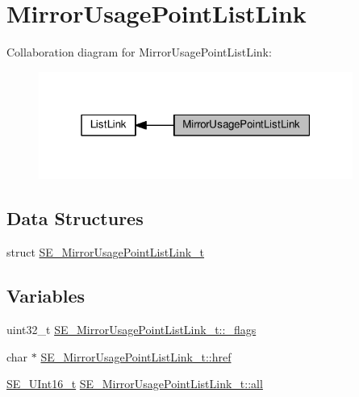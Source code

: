 \hypertarget{group__MirrorUsagePointListLink}{}\section{Mirror\+Usage\+Point\+List\+Link}
\label{group__MirrorUsagePointListLink}
Collaboration diagram for Mirror\+Usage\+Point\+List\+Link\+:\nopagebreak
\begin{figure}[H]
\begin{center}
\leavevmode
\includegraphics[width=292pt]{group__MirrorUsagePointListLink}
\end{center}
\end{figure}
\subsection*{Data Structures}
\begin{DoxyCompactItemize}
\item 
struct \hyperlink{structSE__MirrorUsagePointListLink__t}{S\+E\+\_\+\+Mirror\+Usage\+Point\+List\+Link\+\_\+t}
\end{DoxyCompactItemize}
\subsection*{Variables}
\begin{DoxyCompactItemize}
\item 
uint32\+\_\+t \hyperlink{group__MirrorUsagePointListLink_ga7a496bf032accedbfb6d6c3b2fea9c22}{S\+E\+\_\+\+Mirror\+Usage\+Point\+List\+Link\+\_\+t\+::\+\_\+flags}
\item 
char $\ast$ \hyperlink{group__MirrorUsagePointListLink_ga5a3c1659ae4db4cd0676e59b417d6226}{S\+E\+\_\+\+Mirror\+Usage\+Point\+List\+Link\+\_\+t\+::href}
\item 
\hyperlink{group__UInt16_gac68d541f189538bfd30cfaa712d20d29}{S\+E\+\_\+\+U\+Int16\+\_\+t} \hyperlink{group__MirrorUsagePointListLink_gad6bab1c2ec9114c3752213d0707541fc}{S\+E\+\_\+\+Mirror\+Usage\+Point\+List\+Link\+\_\+t\+::all}
\end{DoxyCompactItemize}


